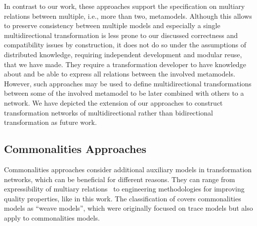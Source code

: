 In contrast to our work, these approaches support the specification on multiary relations between multiple, i.e., more than two, metamodels.
Although this allows to preserve consistency between multiple models and especially a single multidirectional transformation is less prone to our discussed correctness and compatibility issues by construction, it does not do so under the assumptions of distributed knowledge, requiring independent development and modular reuse, that we have made.
They require a transformation developer to have knowledge about and be able to express all relations between the involved metamodels.
However, such approaches may be used to define multidirectional transformations between some of the involved metamodel to be later combined with others to a network.
We have depicted the extension of our approaches to construct transformation networks of multidirectional rather than bidirectional transformation as future work.


\subsection{Commonalities Approaches}

Commonalities approaches consider additional auxiliary models in transformation networks, which can be beneficial for different reasons.
They can range from expressibility of multiary relations~\cite{stevens2020BidirectionalTransformationLarge-SoSym,stunkel2018MultimodelCorrespondence-ICPS} to engineering methodologies for improving quality properties, like in this work.
The classification of \textcite{kolovos2008a} covers commonalities models as \enquote{weave models}, which were originally focused on trace models but also apply to commonalities models.

